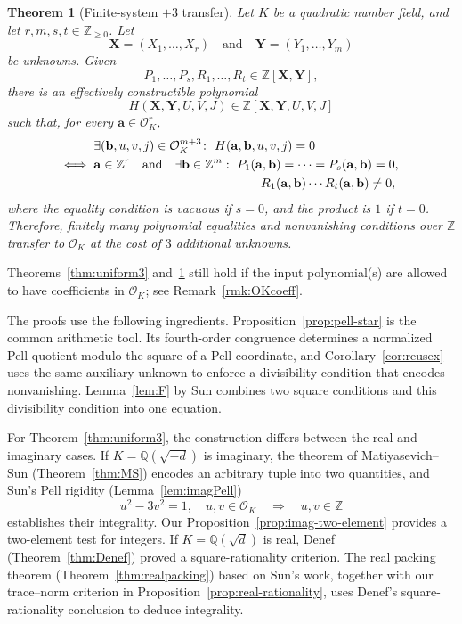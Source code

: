 \documentclass[12pt]{amsart}
\numberwithin{equation}{section}
\newtheorem{theorem}{Theorem}[section]
\theoremstyle{remark}
\theoremstyle{plain}
\newcommand{\Z}{\mathbb{Z}}
\newcommand{\Q}{\mathbb{Q}}
\newcommand{\sO}{\mathcal{O}}
\newcommand{\bX}{\mathbf{X}}
\newcommand{\bY}{\mathbf{Y}}
\newcommand{\ba}{\mathbf{a}}
\newcommand{\bb}{\mathbf{b}}
\begin{document}
\begin{theorem}[Finite-system $+3$ transfer]\label{thm:plus3}
Let $K$ be a quadratic number field, and let $r,m,s,t\in\Z_{\geq0}$. Let
\[
\bX=(X_1,\ldots,X_r)\quad\text{and}\quad\bY=(Y_1,\ldots,Y_m)
\]
be unknowns. Given
\[
P_1,\ldots,P_s,R_1,\ldots,R_t\in\Z[\bX,\bY],
\]
there is an effectively constructible polynomial
\[
H(\bX,\bY,U,V,J)\in\Z[\bX,\bY,U,V,J]
\]
such that, for every $\ba\in\sO_K^r$,
\[
\begin{split}
&\exists(\bb,u,v,j)\in\sO_K^{m+3}\colon\ H(\ba,\bb,u,v,j)=0\\
\Longleftrightarrow\hspace{2mm}&\ba\in\Z^r\quad\text{and}\quad\exists\bb\in\Z^m:\
P_1(\ba,\bb)=\cdots=P_s(\ba,\bb)=0,\\
&\hspace{47.3mm}R_1(\ba,\bb)\cdots R_t(\ba,\bb)\neq0,
\end{split}
\]
where the equality condition is vacuous if $s=0$, and the product is $1$ if $t=0$. Therefore, finitely many polynomial equalities and nonvanishing conditions over $\Z$ transfer to $\sO_K$ at the cost of $3$ additional unknowns.
\end{theorem}
Theorems~\ref{thm:uniform3} and~\ref{thm:plus3} still hold if the input polynomial(s) are allowed to have coefficients in $\sO_K$; see Remark~\ref{rmk:OKcoeff}.

The proofs use the following ingredients. Proposition~\ref{prop:pell-star} is the common arithmetic tool. Its fourth-order congruence determines a normalized Pell quotient modulo the square of a Pell coordinate, and Corollary~\ref{cor:reusex} uses the same auxiliary unknown to enforce a divisibility condition that encodes nonvanishing. Lemma~\ref{lem:F} by Sun combines two square conditions and this divisibility condition into one equation.

For Theorem~\ref{thm:uniform3}, the construction differs between the real and imaginary cases. If $K=\Q(\sqrt{-d})$ is imaginary, the theorem of Matiyasevich--Sun (Theorem~\ref{thm:MS}) encodes an arbitrary tuple into two quantities, and Sun's Pell rigidity (Lemma~\ref{lem:imagPell})
\[
u^2-3v^2=1,\quad u,v\in\sO_K\quad\Longrightarrow\quad u,v\in\Z
\]
establishes their integrality. Our Proposition~\ref{prop:imag-two-element} provides a two-element test for integers. If $K=\Q(\sqrt{d})$ is real, Denef \cite{Denef75} (Theorem~\ref{thm:Denef}) proved a square-rationality criterion. The real packing theorem (Theorem~\ref{thm:realpacking}) based on Sun's work, together with our trace--norm criterion in Proposition~\ref{prop:real-rationality}, uses Denef's square-rationality conclusion to deduce integrality.
\end{document}
